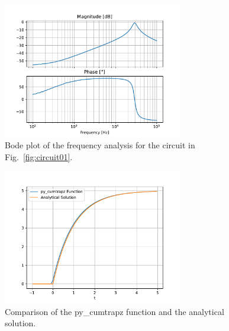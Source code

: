 \documentclass[11pt]{texMemo-gibbons}
\begin{document}
\begin{figure}[h!]
  \centering
  \includegraphics[width=0.7\textwidth]{plots/bode_plots.pdf}
  \caption{Bode plot of the frequency analysis for the circuit in Fig.~\ref{fig:circuit01}.}
  \label{fig:bode_plots}
\end{figure}

\begin{figure}[h!]
  \centering
  \includegraphics[width=0.7\textwidth]{plots/comparison.pdf}
  \caption{Comparison of the py\_cumtrapz function and the analytical solution.}
  \label{fig:comparison}
\end{figure}
\end{document}
